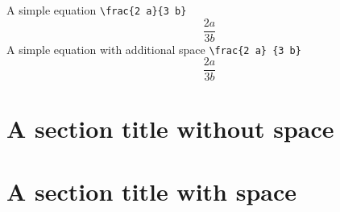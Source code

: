 \documentclass{article}
\begin{document}
A simple equation \verb|\frac{2 a}{3 b}|
\begin{displaymath}
\frac{2a}{3b}
\end{displaymath}
A simple equation with additional space \verb|\frac{2 a} {3 b}|
\begin{displaymath}
\frac{2 a} 
 {3 b}
\end{displaymath}

\section [Section without space]{A section title without space}

\section [Section with space] {A section title with space}
\end{document}
